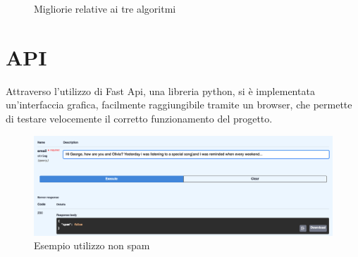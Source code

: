 \documentclass[12pt,a4paper]{article}
\begin{document}
\break
\begin{figure}[H]
    \centering
    \caption{Migliorie relative ai tre algoritmi}
\end{figure}


\section{API}
Attraverso l'utilizzo di Fast Api, una libreria python, si è implementata un'interfaccia grafica, facilmente raggiungibile tramite un browser, che permette di testare velocemente il corretto funzionamento del progetto.


\begin{figure}[H]
    \centering
    \includegraphics[width=1\columnwidth]{api_false.png}
    \caption{Esempio utilizzo non spam}
\end{figure}
\end{document}
